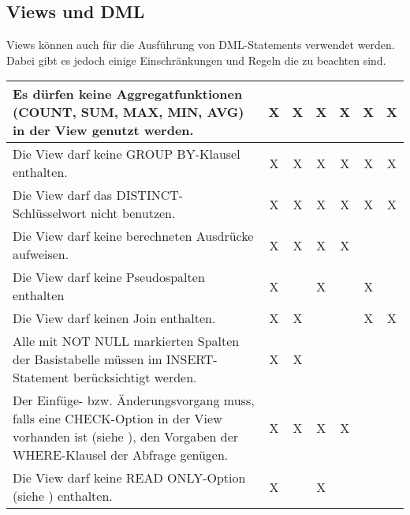       \subsection{Views und DML}
        Views können  auch für die Ausführung von DML-Statements verwendet werden. Dabei gibt es jedoch einige Einschränkungen und Regeln die zu beachten sind.
        \begin{center}
          \label{rulesdmlviews}
          \begin{small}
            \tabletail{
              \hline
            }
            \tablelasttail {
              \hline
            }
            \begin{supertabular}{|p{8.5cm}|c|c|c|c|c|c|}
              Es dürfen keine Aggregatfunktionen (COUNT, SUM, MAX, MIN, AVG) in der View genutzt werden. & X & X & X & X & X & X \\
              \hline
              Die View darf keine GROUP BY-Klausel enthalten. & X & X & X & X & X & X \\
              \hline
              Die View darf das DISTINCT-Schlüsselwort nicht benutzen. & X & X & X & X & X & X\\
              \hline
              Die View darf keine berechneten Ausdrücke aufweisen. & X & X & X & X & & \\
              \hline
              Die View darf keine Pseudospalten enthalten & X & & X & & X & \\
              \hline
              Die View darf keinen Join enthalten. & X & X & & & X & X \\
              \hline
              Alle mit NOT NULL markierten Spalten der Basistabelle müssen im INSERT-Statement berücksichtigt werden. & X & X & & & & \\
              \hline
              Der Einfüge- bzw. Änderungsvorgang muss, falls eine CHECK-Option in der View vorhanden ist (siehe ), den Vorgaben der WHERE-Klausel der Abfrage genügen. & X & X & X & X & & \\
              \hline
              Die View darf keine READ ONLY-Option (siehe ) enthalten. & X & & X & & &\\
            \end{supertabular}
          \end{small}
        \end{center}
		\clearpage
